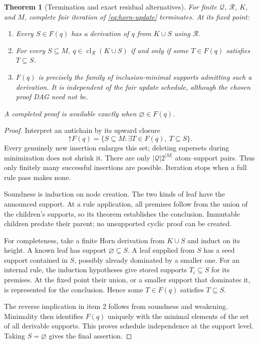 \documentclass[11pt,a4paper]{article}
\newcommand{\up}{\mathord{\uparrow}}\newcommand{\cl}{\operatorname{cl}}
\theoremstyle{plain}
\newtheorem{theorem}{Theorem}[section]
\theoremstyle{definition}
\theoremstyle{remark}
\begin{document}
\begin{theorem}[Termination and exact residual alternatives]\label{thm:antichain}
For finite $\mathcal Q$, $\mathcal R$, $K$, and $M$, complete fair iteration of \eqref{eq:horn-update} terminates. At its fixed point:
\begin{enumerate}
\item Every $S\in F(q)$ has a derivation of $q$ from $K\cup S$ using $\mathcal R$.
\item For every $S\subseteq M$, $q\in\cl_{\mathcal R}(K\cup S)$ if and only if some $T\in F(q)$ satisfies $T\subseteq S$.
\item $F(q)$ is precisely the family of inclusion-minimal supports admitting such a derivation. It is independent of the fair update schedule, although the chosen proof DAG need not be.
\end{enumerate}
A completed proof is available exactly when $\varnothing\in F(q)$.
\end{theorem}
\begin{proof}
Interpret an antichain by its upward closure
\[
 \up F(q)=\{S\subseteq M:\exists T\in F(q),\ T\subseteq S\}.
\]
Every genuinely new insertion enlarges this set; deleting supersets during minimization does not shrink it. There are only $|\mathcal Q|2^{|M|}$ atom--support pairs. Thus only finitely many successful insertions are possible. Iteration stops when a full rule pass makes none.

Soundness is induction on node creation. The two kinds of leaf have the announced support. At a rule application, all premises follow from the union of the children's supports, so its theorem establishes the conclusion. Immutable children predate their parent; no unsupported cyclic proof can be created.

For completeness, take a finite Horn derivation from $K\cup S$ and induct on its height. A known leaf has support $\varnothing\subseteq S$. A leaf supplied from $S$ has a seed support contained in $S$, possibly already dominated by a smaller one. For an internal rule, the induction hypotheses give stored supports $T_i\subseteq S$ for its premises. At the fixed point their union, or a smaller support that dominates it, is represented for the conclusion. Hence some $T\in F(q)$ satisfies $T\subseteq S$.

The reverse implication in item 2 follows from soundness and weakening. Minimality then identifies $F(q)$ uniquely with the minimal elements of the set of all derivable supports. This proves schedule independence at the support level. Taking $S=\varnothing$ gives the final assertion.
\end{proof}
\end{document}
